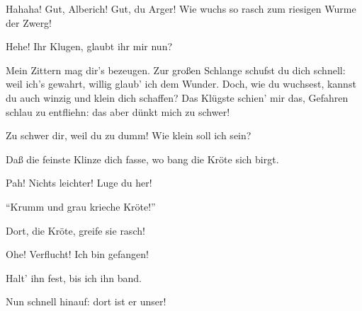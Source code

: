 \begin{drama}
\Wotanspeaks
Hahaha! Gut, Alberich!
Gut, du Arger!
Wie wuchs so rasch
zum riesigen Wurme der Zwerg!
 


\Alberichspeaks
Hehe! Ihr Klugen, glaubt ihr mir nun?
 

\Logespeaks
Mein Zittern mag dir's bezeugen.
Zur großen Schlange schufst du dich schnell:
weil ich's gewahrt,
willig glaub' ich dem Wunder.
Doch, wie du wuchsest,
kannst du auch winzig
und klein dich schaffen?
Das Klügste schien' mir das,
Gefahren schlau zu entfliehn:
das aber dünkt mich zu schwer!
 

\Alberichspeaks
Zu schwer dir, weil du zu dumm!
Wie klein soll ich sein?
 

\Logespeaks
Daß die feinste Klinze dich fasse,
wo bang die Kröte sich birgt.
 

\Alberichspeaks
Pah! Nichts leichter! Luge du her!
 



``Krumm und grau krieche Kröte!''
 




\Logespeaks
{}
Dort, die Kröte, greife sie rasch!
 




\Alberichspeaks
Ohe! Verflucht! Ich bin gefangen!
 

\Logespeaks
Halt' ihn fest, bis ich ihn band.
 




\Logespeaks
Nun schnell hinauf: dort ist er unser!
 



 
\scene


\end{drama}
